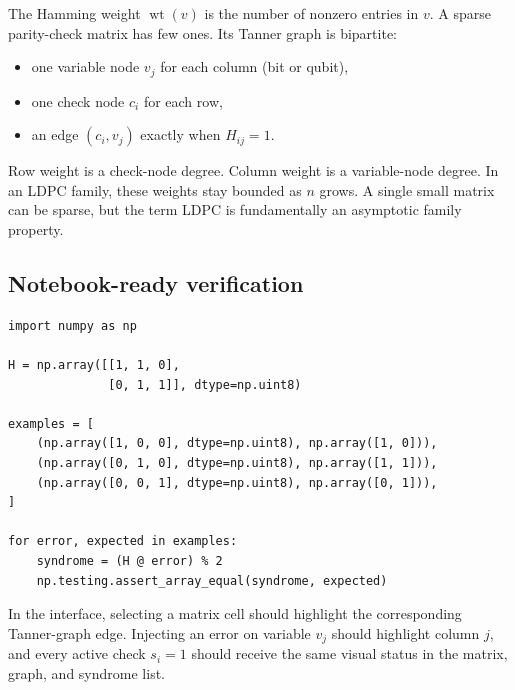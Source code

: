 \documentclass[11pt]{article}
\newcommand{\wt}{\operatorname{wt}}
\begin{document}
The Hamming weight \(\wt(v)\) is the number of nonzero entries in \(v\). A sparse parity-check
matrix has few ones. Its Tanner graph is bipartite:

\begin{itemize}
  \item one variable node \(v_j\) for each column (bit or qubit),
  \item one check node \(c_i\) for each row,
  \item an edge \((c_i,v_j)\) exactly when \(H_{ij}=1\).
\end{itemize}

\begin{center}
\end{center}

Row weight is a check-node degree. Column weight is a variable-node degree. In an LDPC family,
these weights stay bounded as \(n\) grows. A single small matrix can be sparse, but the term LDPC
is fundamentally an asymptotic family property.

\subsection{Notebook-ready verification}

\begin{lstlisting}[style=python]
import numpy as np

H = np.array([[1, 1, 0],
              [0, 1, 1]], dtype=np.uint8)

examples = [
    (np.array([1, 0, 0], dtype=np.uint8), np.array([1, 0])),
    (np.array([0, 1, 0], dtype=np.uint8), np.array([1, 1])),
    (np.array([0, 0, 1], dtype=np.uint8), np.array([0, 1])),
]

for error, expected in examples:
    syndrome = (H @ error) % 2
    np.testing.assert_array_equal(syndrome, expected)
\end{lstlisting}

\begin{hcibox}
In the interface, selecting a matrix cell should highlight the corresponding Tanner-graph edge.
Injecting an error on variable \(v_j\) should highlight column \(j\), and every active check
\(s_i=1\) should receive the same visual status in the matrix, graph, and syndrome list.
\end{hcibox}
\end{document}
